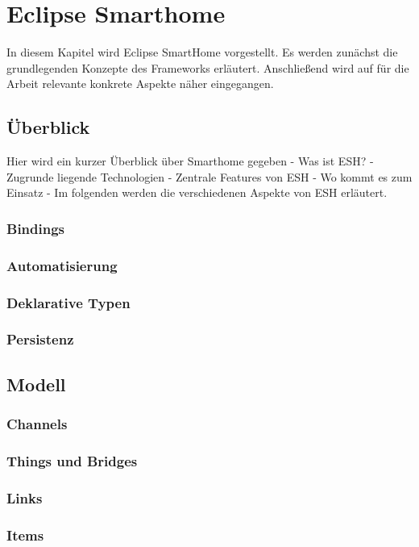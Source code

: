 \chapter{Eclipse Smarthome}
\label{chap:esh}
In diesem Kapitel wird Eclipse SmartHome vorgestellt. Es werden zunächst die grundlegenden Konzepte des Frameworks erläutert. Anschließend wird auf für die Arbeit relevante konkrete Aspekte näher eingegangen.

\section{Überblick}
Hier wird ein kurzer Überblick über Smarthome gegeben
- Was ist ESH?
- Zugrunde liegende Technologien
- Zentrale Features von ESH
- Wo kommt es zum Einsatz
-
Im folgenden werden die verschiedenen Aspekte von ESH erläutert.

\subsection{Bindings}
\subsection{Automatisierung}
\subsection{Deklarative Typen}
\subsection{Persistenz}

\section{Modell}
\subsection{Channels}
\subsection{Things und Bridges}
\subsection{Links}
\subsection{Items}
